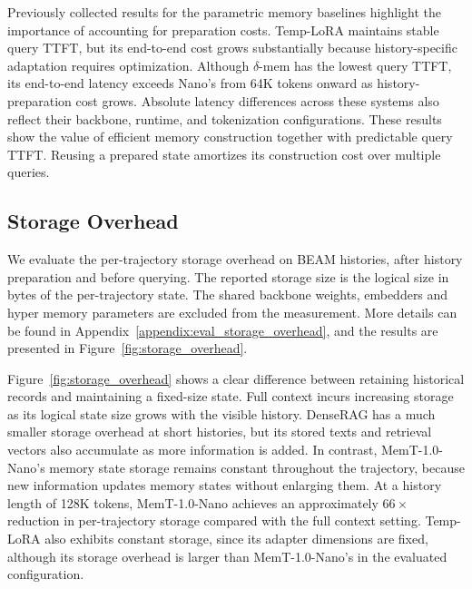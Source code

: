 Previously collected results for the parametric memory baselines highlight the importance of accounting for preparation costs.
Temp-LoRA maintains stable query TTFT, but its end-to-end cost grows substantially because history-specific adaptation requires optimization.
Although $\delta$-mem has the lowest query TTFT, its end-to-end latency exceeds Nano's from 64K tokens onward as history-preparation cost grows.
Absolute latency differences across these systems also reflect their backbone, runtime, and tokenization configurations.
These results show the value of efficient memory construction together with predictable query TTFT.
Reusing a prepared state amortizes its construction cost over multiple queries.



\subsection{Storage Overhead}
\label{sec:storage_overhead}
We evaluate the per-trajectory storage overhead on BEAM histories, after history preparation and before querying.
The reported storage size is the logical size in bytes of the per-trajectory state.
The shared backbone weights, embedders and hyper memory parameters are excluded from the measurement.
More details can be found in Appendix~\ref{appendix:eval_storage_overhead}, and the results are presented in Figure~\ref{fig:storage_overhead}.

Figure~\ref{fig:storage_overhead} shows a clear difference between retaining historical records and maintaining a fixed-size state.
Full context incurs increasing storage as its logical state size grows with the visible history.
DenseRAG has a much smaller storage overhead at short histories, but its stored texts and retrieval vectors also accumulate as more information is added.
In contrast, MemT-1.0-Nano's memory state storage remains constant throughout the trajectory, because new information updates memory states without enlarging them.
At a history length of 128K tokens, MemT-1.0-Nano achieves an approximately $66\times$ reduction in per-trajectory storage compared with the full context setting.
Temp-LoRA also exhibits constant storage, since its adapter dimensions are fixed, although its storage overhead is larger than MemT-1.0-Nano's in the evaluated configuration.

